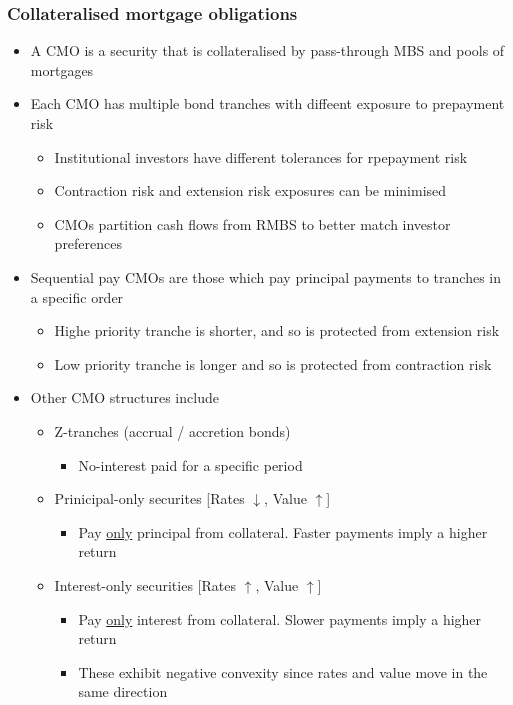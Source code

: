 \documentclass[../notes_compiled.tex]{subfiles}
\begin{document}
\subsubsection{Collateralised mortgage obligations}
\begin{itemize}
\item A CMO is a security that is collateralised by pass-through MBS and pools of mortgages
\item Each CMO has multiple bond tranches with diffeent exposure to prepayment risk
\begin{itemize}
\item Institutional investors have different tolerances for rpepayment risk
\item Contraction risk and extension risk exposures can be minimised
\item CMOs partition cash flows from RMBS to better match investor preferences
\end{itemize}
\item Sequential pay CMOs are those which pay principal payments to tranches in a specific order
\begin{itemize}
\item Highe priority tranche is shorter, and so is protected from extension risk
\item Low priority tranche is longer and so is protected from contraction risk
\end{itemize}
\item Other CMO structures include
\begin{itemize}
\item Z-tranches (accrual / accretion bonds)
\begin{itemize}
\item No-interest paid for a specific period
\end{itemize}
\item Prinicipal-only securites [Rates $\downarrow$, Value $\uparrow$]
\begin{itemize}
\item Pay \underline{only} principal from collateral. Faster payments imply a higher return
\end{itemize}
\item Interest-only securities [Rates $\uparrow$, Value $\uparrow$]
\begin{itemize}
\item Pay \underline{only} interest from collateral. Slower payments imply a higher return
\item These exhibit negative convexity since rates and value move in the same direction

\end{itemize}
\end{itemize}
\end{itemize}
\end{document}
